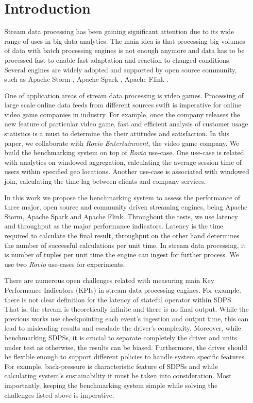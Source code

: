 \section{Introduction}
Stream data processing has been gaining significant attention due to its wide range of uses in big data analytics. The main idea is that processing big volumes of data with batch processing engines is not enough anymore and data has to be processed fast to enable fast adaptation and reaction to changed conditions. Several engines are widely adopted and supported by open source community, such as Apache Storm \cite{toshniwal2014storm}, Apache Spark  \cite{zaharia2012discretized} , Apache Flink \cite{carbone2015apache}. 

One of application areas of stream data processing is  video games. Processing of large scale online data feeds from different sources swift is imperative for online video game companies in industry. For example, once the company releases the new feature of particular video game, fast and efficient analysis of customer usage statistics is a must to determine the their attitudes and satisfaction. In this paper, we collaborate with \textit{Rovio Entertainment}, the video game company. We build the benchmarking system on top of \textit{Rovio} use-case. One use-case is related with analytics on windowed aggregation, calculating the average session time of users within specified geo locations. Another use-case is associated with windowed join, calculating the time lag between clients and company services. 

In this work we propose the benchmarking system to assess the performance of three major, open source and community driven streaming engines, being Apache Storm, Apache Spark and Apache Flink.  Throughout  the tests, we use latency and throughput as the major performance indicators. Latency is the time required to calculate the final result, throughput on the other hand determines the number of successful calculations per unit time. In stream data processing, it is number of tuples per unit time the engine can ingest for further process. We use two \textit{Rovio} use-cases for experiments. 


There are numerous open challenges related with measuring main Key Performance Indicators (KPIs) in stream data processing engines. For example, there is not clear definition for the latency of stateful operator within SDPS.   That is,  the stream is theoretically infinite and there is no final output. While the previous works use checkpointing each event's ingestion and output time, this can lead to misleading results and escalade the driver's complexity. Moreover, while benchmarking SDPSs, it is crucial to separate completely the driver and units under test as otherwise, the results can be biased. Furthermore, the driver should be flexible enough to support different policies to handle system specific features. For example, back-pressure is characteristic feature of SDPSs and while calculating system's sustainability it must be taken into consideration.
Most importantly, keeping the benchmarking system simple while solving the challenges listed above is imperative. 

